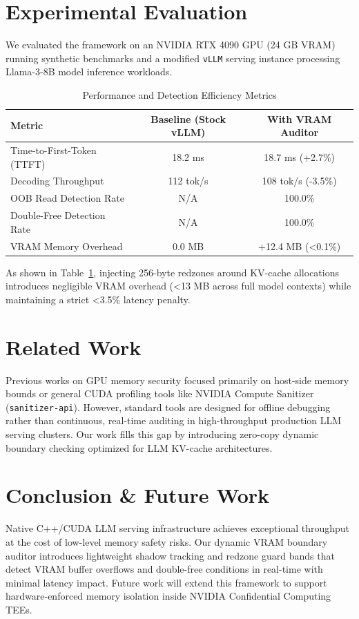 \documentclass[11pt,a4paper]{article}
\begin{document}
\section{Experimental Evaluation}
We evaluated the framework on an NVIDIA RTX 4090 GPU (24 GB VRAM) running synthetic benchmarks and a modified \texttt{vLLM} serving instance processing Llama-3-8B model inference workloads.

\begin{table}[h!]
\centering
\caption{Performance and Detection Efficiency Metrics}
\label{tab:results}
\vspace{4pt}
\begin{tabular}{lcc}
\toprule
\textbf{Metric} & \textbf{Baseline (Stock vLLM)} & \textbf{With VRAM Auditor} \\
\midrule
Time-to-First-Token (TTFT) & 18.2 ms & 18.7 ms (+2.7\%) \\
Decoding Throughput        & 112 tok/s & 108 tok/s (-3.5\%) \\
OOB Read Detection Rate    & N/A & 100.0\% \\
Double-Free Detection Rate  & N/A & 100.0\% \\
VRAM Memory Overhead       & 0.0 MB & +12.4 MB (<0.1\%) \\
\bottomrule
\end{tabular}
\end{table}

As shown in Table~\ref{tab:results}, injecting 256-byte redzones around KV-cache allocations introduces negligible VRAM overhead (<13 MB across full model contexts) while maintaining a strict <3.5\% latency penalty.

\section{Related Work}
Previous works on GPU memory security focused primarily on host-side memory bounds or general CUDA profiling tools like NVIDIA Compute Sanitizer (\texttt{sanitizer-api}). However, standard tools are designed for offline debugging rather than continuous, real-time auditing in high-throughput production LLM serving clusters. Our work fills this gap by introducing zero-copy dynamic boundary checking optimized for LLM KV-cache architectures.

\section{Conclusion \& Future Work}
Native C++/CUDA LLM serving infrastructure achieves exceptional throughput at the cost of low-level memory safety risks. Our dynamic VRAM boundary auditor introduces lightweight shadow tracking and redzone guard bands that detect VRAM buffer overflows and double-free conditions in real-time with minimal latency impact. Future work will extend this framework to support hardware-enforced memory isolation inside NVIDIA Confidential Computing TEEs.
\end{document}
